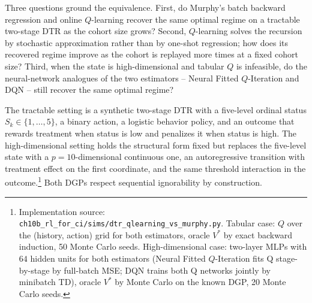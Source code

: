 Three questions ground the equivalence. First, do Murphy's batch backward regression and online $Q$-learning recover the same optimal regime on a tractable two-stage DTR as the cohort size grows? Second, $Q$-learning solves the recursion by stochastic approximation rather than by one-shot regression; how does its recovered regime improve as the cohort is replayed more times at a fixed cohort size? Third, when the state is high-dimensional and tabular $Q$ is infeasible, do the neural-network analogues of the two estimators -- Neural Fitted $Q$-Iteration and DQN -- still recover the same optimal regime?

The tractable setting is a synthetic two-stage DTR with a five-level ordinal status $S_k \in \{1, \ldots, 5\}$, a binary action, a logistic behavior policy, and an outcome that rewards treatment when status is low and penalizes it when status is high. The high-dimensional setting holds the structural form fixed but replaces the five-level state with a $p = 10$-dimensional continuous one, an autoregressive transition with treatment effect on the first coordinate, and the same threshold interaction in the outcome.\footnote{Implementation source: \texttt{ch10b\_rl\_for\_ci/sims/dtr\_qlearning\_vs\_murphy.py}. Tabular case: $Q$ over the (history, action) grid for both estimators, oracle $V^*$ by exact backward induction, 50 Monte Carlo seeds. High-dimensional case: two-layer MLPs with $64$ hidden units for both estimators (Neural Fitted $Q$-Iteration fits Q stage-by-stage by full-batch MSE; DQN trains both Q networks jointly by minibatch TD), oracle $V^*$ by Monte Carlo on the known DGP, 20 Monte Carlo seeds.} Both DGPs respect sequential ignorability by construction.

